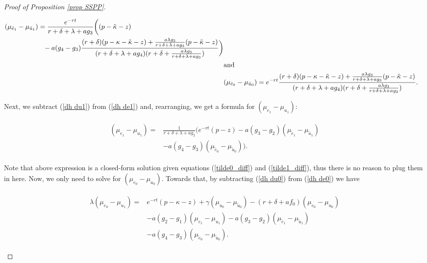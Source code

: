 \documentclass[12pt]{article} %
\theoremstyle{definition}
\begin{document}
\begin{proof}[Proof of Proposition \ref{prop SSPP}]
\begin{fleqn}
\begin{align}
\begin{split}
&(\mu_{\tilde{e}_1}-\mu_{\tilde{u}_1})=\frac{e^{-rt}}{r+\delta+\lambda+ag_3}\biggl((p-\tilde{\kappa}-z)\\
& \hspace{2cm} -a(g_4-g_3)\frac{(r+\delta)(p-\kappa-\tilde{\kappa}-z)+\frac{a\lambda g_3}{r+\delta+\lambda+ag_3}(p-\tilde{\kappa}-z)}{(r+\delta+\lambda+ag_4)(r+\delta+\frac{a\lambda g_3}{r+\delta+\lambda+ag_3})}\biggr) \label{tilde1_diff} 
\end{split} \\
&\text{and} \notag \\
& (\mu_{\tilde{e}_0}-\mu_{\tilde{u}_0})=e^{-rt}\frac{(r+\delta)(p-\kappa-\tilde{\kappa}-z)+\frac{a\lambda g_3}{r+\delta+\lambda+ag_3}(p-\tilde{\kappa}-z)}{(r+\delta+\lambda+ag_4)(r+\delta+\frac{a\lambda g_3}{r+\delta+\lambda+ag_3})}. \label{tilde0_diff}
\end{align}
\end{fleqn}
Next, we subtract (\ref{dh du1}) from (\ref{dh de1}) and, rearranging, we get a formula for $(\mu_{e_1}-\mu_{u_1})$:
\begin{fleqn}
\begin{align}
\begin{split}
 (\mu_{e_1}-\mu_{u_1})= & \frac{1}{r+\delta+\lambda+ag_2}\bigl(e^{-rt}(p-z)-a(g_3-g_2)(\mu_{\tilde{e}_1}-\mu_{\tilde{u}_1}) \\
& -a(g_4-g_3)(\mu_{\tilde{e}_0}-\mu_{\tilde{u}_0})\bigr). \label{1_diff} 
\end{split}
\end{align}
\end{fleqn}

\noindent Note that above expression is a closed-form solution given equations (\ref{tilde0_diff}) and (\ref{tilde1_diff}), thus there is no reason to plug them in here. Now, we only need to solve for $(\mu_{e_0}-\mu_{u_0})$. Towards that, by subtracting (\ref{dh du0}) from (\ref{dh de0}) we have

\begin{fleqn}
\begin{align}
\begin{split}
\lambda(\mu_{e_0}-\mu_{u_1}) =& e^{-rt}(p-\kappa-z)+\gamma(\mu_{u_0}-\mu_{\tilde{u}_0}) - (r+\delta+af_0)(\mu_{e_0}-\mu_{u_0}) \\
& -a(g_2-g_1)(\mu_{e_1}-\mu_{u_1})-a(g_3-g_2)(\mu_{\tilde{e}_1}-\mu_{\tilde{u}_1})\\
& -a(g_4-g_3)(\mu_{\tilde{e}_0}-\mu_{\tilde{u}_0}). \label{prog5}
\end{split}
\end{align}
\end{fleqn}


\end{proof}
\end{document}

